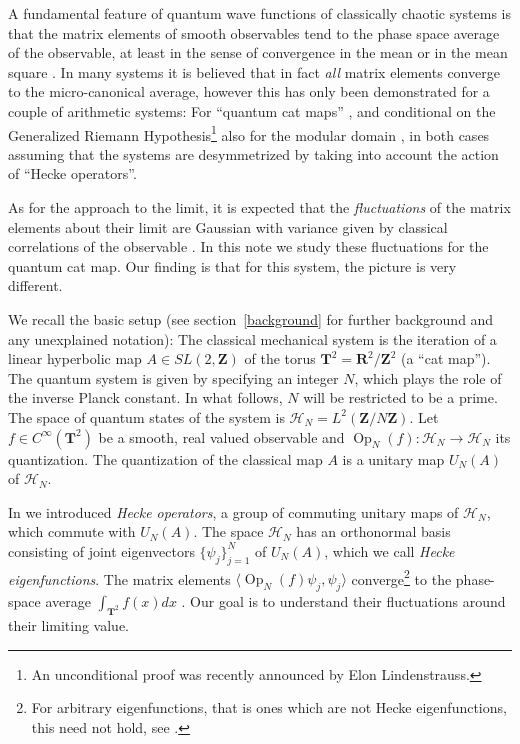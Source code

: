 \documentclass[12pt]{amsart}
\theoremstyle{plain}
\newcommand{\Z}{{\mathbf Z}}
\newcommand{\R}{{\mathbf R}}
\newcommand{\TT}{\mathbf T^2}
\newcommand{\OPN}{\operatorname{Op}_N}
\newcommand{\UN}{U_N}
\newcommand{\HN}{\mathcal H_N}
\renewcommand{\^}{\widehat}
\begin{document}
A fundamental feature of  quantum wave functions of classically
chaotic systems is that the matrix elements of smooth observables
tend to the phase space average of the observable, at least in the
sense  of convergence in the mean \cite{schnirelman-qe, CdV, Zelditch87} or
in the mean square \cite{Zelditch-c-star}. In many systems it is
believed that in fact {\em all} matrix elements converge to the
micro-canonical average, however this has only been demonstrated
for a couple of arithmetic systems: 
For ``quantum cat maps'' \cite{cat1}, 
and conditional on the
Generalized Riemann Hypothesis\footnote{An unconditional proof was
recently announced by Elon Lindenstrauss.}
also for the modular domain
\cite{Watson-thesis}, in both cases assuming that the systems are
desymmetrized by taking into account the action of ``Hecke operators''. 

As for the approach to the limit, it is expected that the  {\em
fluctuations} of the matrix elements about their limit are Gaussian
with variance given by classical correlations of the observable
\cite{feingold-peres-matrix-elements, EFKAMM}. 
In this note we study these fluctuations for the quantum cat map. 
Our finding is that for this system, the picture is very different. 


We recall the basic setup \cite{BH, DE, DEGI, cat1} (see
section~\ref{background} for further background and any unexplained notation): 
The classical mechanical system is the iteration of a 
linear hyperbolic map $A\in SL(2,\Z)$  of the torus $\TT=\R^2/\Z^2$ 
(a ``cat map'').   
The quantum system is given by specifying an integer $N$, which 
plays the role of the inverse Planck constant. In what follows, $N$
will  be restricted to be a prime. 
The space of quantum states of the system is 
$\HN=L^2(\Z/N\Z)$.      
Let $f\in C^\infty(\TT)$ be a smooth, real valued observable and
$\OPN(f):\HN\to \HN$ its quantization.  
The quantization of the classical map $A$ is a unitary map $\UN(A)$ of
$\HN$. 

In \cite{cat1} we introduced {\em Hecke operators}, 
a group of commuting unitary maps of $\HN$, which 
commute with $\UN(A)$. The
space $\HN$ has an orthonormal basis consisting of  joint
eigenvectors $\{\psi_j\}_{j=1 }^N$ of $\UN(A)$, which we call {\em
Hecke  eigenfunctions}.    
The matrix elements $\langle\OPN(f)\psi_j,\psi_j\rangle$
converge\footnote{For arbitrary eigenfunctions, that is ones  which
are not Hecke eigenfunctions, this need not hold, see
\cite{scarred-cat}.} 
to the phase-space average $\int_{\TT} f(x) dx$ \cite{cat1}. 
Our goal is to understand their fluctuations around their limiting value. 
\end{document}
